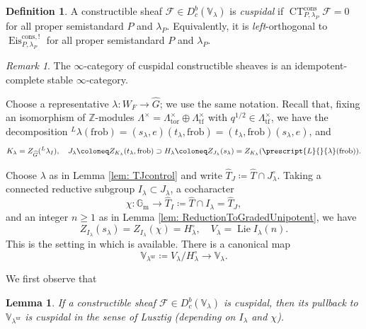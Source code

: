 \documentclass{amsart}
\newtheorem{lemma}[theorem]{Lemma}
\theoremstyle{definition}
\newtheorem{definition}[theorem]{Definition}
\theoremstyle{remark}
\newtheorem{remark}[theorem]{Remark}
\numberwithin{equation}{section}
\DeclareMathOperator{\Lie}{Lie}
\newcommand{\mc}{\mathcal}
\newcommand{\Z}{\mathbb{Z}}
\newcommand{\Gm}{{\mathbb{G}_{\mathrm{m}}}}
\newcommand{\co}[1]{\prescript{#1}{}}
\newcommand{\wh}{\widehat}
\newcommand{\frob}{\mathrm{frob}}
\DeclareMathOperator{\Eis}{\mathrm{Eis}}
\DeclareMathOperator{\CT}{\mathrm{CT}}
\newcommand{\ur}{\mathrm{ur}}
\newcommand{\V}{\mathbb{V}}
\newcommand{\tor}{\mathrm{tor}}
\newcommand{\tf}{\mathrm{tf}}
\begin{document}
\begin{definition}\label{def: CuspidalLocalSystem}
A constructible sheaf $\mc F \in D^b_c(\V_\lambda)$ is \emph{cuspidal} if $\CT_{P, \lambda_P}^{\mathrm{cons}} \mc F=0$ for all proper semistandard $P$ and $\lambda_P$. Equivalently, it is \emph{left}-orthogonal to $\Eis_{P,\lambda_P}^{\mathrm{cons},!}$ for all proper semistandard $P$ and $\lambda_P$.  
\end{definition}

\begin{remark}
The $\infty$-category of cuspidal constructible sheaves is an idempotent-complete stable $\infty$-category. 
\end{remark}

Choose a representative $\lambda\colon W_F\to \wh G$; we use the same notation. Recall that, fixing an isomorphism of $\Z$-modules $\Lambda^{\times} = \Lambda_{\tor}^{\times} \oplus \Lambda_{\tf}^{\times}$ with $q^{1/2} \in \Lambda_{\tf}^{\times}$, we have the decomposition ${}^L \lambda(\frob)=(s_\lambda, e)(t_\lambda, \frob)=(t_\lambda, \frob)(s_\lambda, e)$, and
\[
K_\lambda=Z_{\wh G}({}^L \lambda_{I}), \quad J_\lambda\coloneq Z_{K_\lambda}(t_\lambda, \frob) \supset  H_\lambda \coloneq Z_{J_\lambda} (s_\lambda)=Z_{K_\lambda} (\co{L}{\lambda}(\frob)). 
\]

Choose $\lambda$ as in Lemma \ref{lem: TJcontrol} and write $\wh T_J\coloneq \wh T\cap J_\lambda^\circ$. 
Taking a connected reductive subgroup $I_\lambda \subset J_\lambda$, a cocharacter \[
\chi\colon \Gm\to \wh T_I\coloneq \wh T\cap I_\lambda=\wh T_J,
\]
and an integer $n\geq 1$ as in Lemma \ref{lem: ReductionToGradedUnipotent}, we have
\[
Z_{I_\lambda}(s_\lambda)=Z_{I_\lambda}(\chi)=H_\lambda^\circ, \quad V_\lambda=\Lie I_\lambda (n). 
\]
This is the setting in which \cite{LusztigGraded} is available. There is a canonical map
\[
\V_{\lambda^\ur} \coloneq V_\lambda /H_\lambda^\circ  \to \V_\lambda.  
\]

We first observe that

\begin{lemma}\label{lem: reduction_to_LusztigGraded}
If a constructible sheaf $\mc F\in D_c^b (\V_\lambda)$ is cuspidal, then its pullback to $\V_{\lambda^\ur}$ is cuspidal in the sense of Lusztig (depending on $I_\lambda$ and $\chi$).
\end{lemma}
\end{document}
